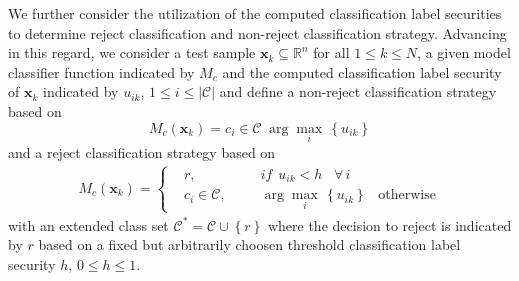 \documentclass[english]{HSMW-Thesis}
\begin{document}
We further consider the utilization of the computed classification label securities to determine reject classification and non-reject classification strategy\cite{hanczar2019performance}. Advancing in this regard, we consider a test sample \hspace{2pt}$\mathbf{x}_{k}\subseteq \mathbb{R}^n$\hspace{2pt} for all\hspace{2pt} $1\leq k \leq N$, a given model classifier function indicated by\hspace{2pt} $M_{c}$\hspace{2pt} and the computed classification label security of\hspace{2pt} $\mathbf{x}_{k}$\hspace{2pt} indicated by\hspace{2pt} $u_{ik}$,\hspace{2pt} $1\leq i \leq |\mathcal{C}|$\hspace{2pt} and define a non-reject classification strategy based on
\begin{equation}\label{non reject classification}
	M_{c}(\mathbf{x}_{k}) = c_{i}\in\mathcal{C} \hspace{3pt} \arg\max_i\hspace{2pt}\left\lbrace u_{ik}\right\rbrace 
\end{equation}
and a reject classification strategy based on 
\begin{align}\label{reject classification strategy}
	 	M_{c}(\mathbf{x}_{k})= 
	\left \{
	\begin{aligned}
		&r, &&  \hspace{10pt}if\hspace{5pt}u_{ik}< h\hspace{10pt} \forall\hspace{2pt} i  \\
		&c_{i}\in\mathcal{C}, &&  \hspace{10pt}\arg\max_i\hspace{2pt}\left\lbrace u_{ik}\right\rbrace \hspace{10pt}\text{otherwise}
	\end{aligned} \right.
\end{align}
with an extended class set\hspace{2pt} $\mathcal{C}^{\ast} = \mathcal{C}\cup \left\lbrace r\right\rbrace  $\hspace{2pt} where the decision to reject is indicated by\hspace{2pt} $r$\hspace{2pt} based on a fixed but arbitrarily choosen threshold classification label security \hspace{2pt}$h$,\hspace{2pt} $0\leq  h \leq 1$\cite{hanczar2019performance}.
\end{document}
